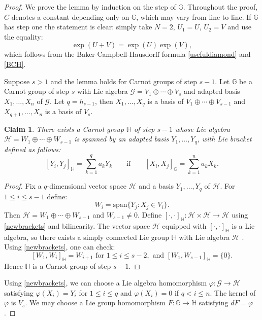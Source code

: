 \documentclass[reqno, 11pt]{amsart}
\newtheorem{claim}[theorem]{Claim}
\theoremstyle{definition}
\theoremstyle{remark}
\numberwithin{theorem}{section}
\numberwithin{equation}{section}
\begin{document}
\begin{proof}
We prove the lemma by induction on the step of $\mathbb{G}$. Throughout the proof, $C$ denotes a constant depending only on $\mathbb{G}$, which may vary from line to line. If $\mathbb{G}$ has step one the statement is clear: simply take $N=2$, $U_{1}=U$, $U_{2}=V$ and use the equality:
\[\exp(U+V)=\exp(U)\exp(V),\]
which follows from the Baker-Campbell-Hausdorff formula \eqref{usefuldiamond} and \eqref{BCH}.

Suppose $s>1$ and the lemma holds for Carnot groups of step $s-1$. Let $\mathbb{G}$ be a Carnot group of step $s$ with Lie algebra $\mathcal{G}=V_{1}\oplus \cdots \oplus V_{s}$ and adapted basis $X_{1}, \ldots, X_{n}$ of $\mathcal{G}$. Let $q=h_{s-1}$, then $X_{1}, \ldots, X_{q}$ is a basis of $V_{1}\oplus \cdots \oplus V_{s-1}$ and $X_{q+1}, \ldots, X_{n}$ is a basis of $V_{s}$.

\begin{claim}
There exists a Carnot group $\mathbb{H}$ of step $s-1$ whose Lie algebra $\mathcal{H}=W_{1}\oplus \cdots \oplus W_{s-1}$ is spanned by an adapted basis $Y_{1}, \ldots, Y_{q}$, with Lie bracket defined as follows:
\begin{equation}\label{newbrackets} [Y_{i},Y_{j}]_{\mathbb{H}}=\sum_{k=1}^{q}a_{k}Y_{k} \qquad \mbox{if} \qquad [X_{i},X_{j}]_{\mathbb{G}}=\sum_{k=1}^{n}a_{k}X_{k}.\end{equation}
\end{claim}

\begin{proof}
Fix a $q$-dimensional vector space $\mathcal{H}$ and a basis $Y_{1}, \ldots, Y_{q}$ of $\mathcal{H}$. For $1\leq i\leq s-1$ define:
\[W_{i}=\mathrm{span} \{Y_{j}: X_{j}\in V_{i}\}.\]
Then $\mathcal{H}=W_{1}\oplus \cdots \oplus W_{s-1}$ and $W_{s-1}\neq 0$. Define $[\cdot,\cdot]_{\mathbb{H}}\colon \mathcal{H}\times \mathcal{H}\to \mathcal{H}$ using \eqref{newbrackets} and bilinearity. The vector space $\mathcal{H}$ equipped with $[\cdot, \cdot]_{\mathbb{H}}$ is a Lie algebra, so there exists a simply connected Lie group $\mathbb{H}$ with Lie algebra $\mathcal{H}$ \cite[Theorem 2.2.14]{BLU}. Using \eqref{newbrackets}, one can check:
\[ [W_{1}, W_{i}]_{\mathbb{H}}=W_{i+1} \mbox{ for }1\leq i\leq s-2, \mbox{ and } [W_{1},W_{s-1}]_{\mathbb{H}}=\{0\}.\]
Hence $\mathbb{H}$ is a Carnot group of step $s-1$.
\end{proof}

Using \eqref{newbrackets}, we can choose a Lie algebra homomorphism $\varphi \colon \mathcal{G}\to \mathcal{H}$ satisfying $\varphi(X_{i})=Y_{i}$ for $1\leq i\leq q$ and $\varphi(X_{i})=0$ if $q<i\leq n$. The kernel of $\varphi$ is $V_{s}$. We may choose a Lie group homomorphism $F\colon \mathbb{G}\to \mathbb{H}$ satisfying $dF=\varphi$ \cite[Remark 2.1.60]{BLU}.


\end{proof}
\end{document}
